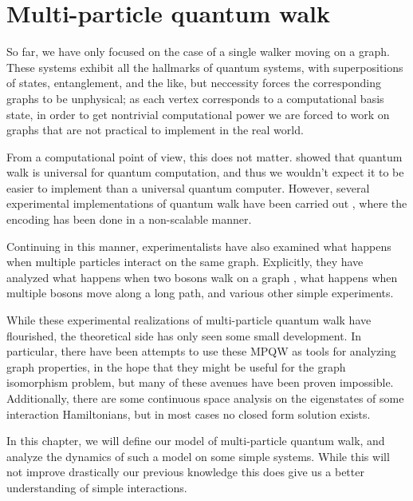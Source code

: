 \documentclass[../thesis-main/thesis-main]{subfiles}
\begin{document}
 
\chapter{Multi-particle quantum walk}
\label{chap:MPQW}


So far, we have only focused on the case of a single walker moving on a graph.  These systems exhibit all the hallmarks of quantum systems, with superpositions of states, entanglement, and the like, but neccessity forces the corresponding graphs to be unphysical; as each vertex corresponds to a computational basis state, in order to get nontrivial computational power we are forced to work on graphs that are not practical to implement in the real world.

From a computational point of view, this does not matter.   showed that quantum walk is universal for quantum computation, and thus we wouldn't expect it to be easier to implement than a universal quantum computer.  However, several experimental implementations of quantum walk have been carried out \cite{DSBEFFMZ05, KFC09, PLP08}, where the encoding has been done in a non-scalable manner.  

Continuing in this manner, experimentalists have also examined what happens when multiple particles interact on the same graph.  Explicitly, they have analyzed what happens when two bosons walk on a graph \cite{BLMS09, PLM10,SSVMCRO12}, what happens when multiple bosons move along a long path, and various other simple experiments.


While these experimental realizations of multi-particle quantum walk have flourished, the theoretical side has only seen some small development.  In particular, there have been attempts to use these MPQW as tools for analyzing graph properties, in the hope that they might be useful for the graph isomorphism problem, but many of these avenues have been proven impossible.  Additionally, there are some continuous space analysis on the eigenstates of some interaction Hamiltonians, but in most cases no closed form solution exists.

In this chapter, we will define our model of multi-particle quantum walk, and analyze the dynamics of such a model on some simple systems.  While this will not improve drastically our previous knowledge this does give us a better understanding of simple interactions.
\end{document}
